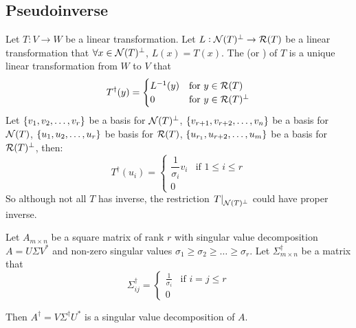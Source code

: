 \subsection{Pseudoinverse}

\begin{definition}
    Let $T: V \rightarrow W$ be a linear transformation. Let $L: \mathcal{N}(T)^\bot \rightarrow \mathcal{R}(T)$ be a linear transformation that $\forall x \in \mathcal{N}(T)^\bot$, $L(x) = T(x)$. The  (or ) of $T$ is a unique linear transformation from $W$ to $V$ that
    \begin{equation}
        T^\dag (y) = \begin{cases}
            L^{-1}(y) & \text{for } y \in \mathcal{R}(T) \\
            0 & \text{for } y \in \mathcal{R}(T)^\bot
        \end{cases}
    \end{equation}
    Let $\set{v_1, v_2,\dots, v_r}$ be a basis for $\mathcal{N}(T)^\bot$, $\set{v_{r+1}, v_{r+2}, \dots, v_{n}}$ be a basis for $\mathcal{N}(T)$, $\set{u_1, u_2, \dots, u_r}$ be basis for $\mathcal{R}(T)$, $\set{u_{r_1}, u_{r+2}, \dots, u_m}$ be a basis for $\mathcal{R}(T)^\bot$, then:
    \begin{equation*}
        T^\dag (u_i) = \begin{cases}
            \dfrac{1}{\sigma_i} v_i & \text{if } 1 \leq i \leq r \\
            0
        \end{cases}
    \end{equation*}
    So although not all $T$ has inverse, the restriction $\left. T \right|_{\mathcal{N}(T)^\bot}$ could have proper inverse.
\end{definition}

\begin{theorem}
    Let $A_{m \times n}$ be a square matrix of rank $r$ with singular value decomposition $A = U \Sigma V^*$ and non-zero singular values $\sigma_1 \geq \sigma_2 \geq \dots \geq \sigma_r$. Let $\Sigma^\dag_{m \times n}$  be a matrix that 
    \begin{equation}
        \Sigma^\dag_{ij} = \begin{cases}
            \frac{1}{\sigma_i} & \text{if } i = j \leq r \\
            0 
        \end{cases}
    \end{equation}
    
    Then $A^\dag = V \Sigma^\dag U^*$ is a singular value decomposition of $A$.
\end{theorem}


